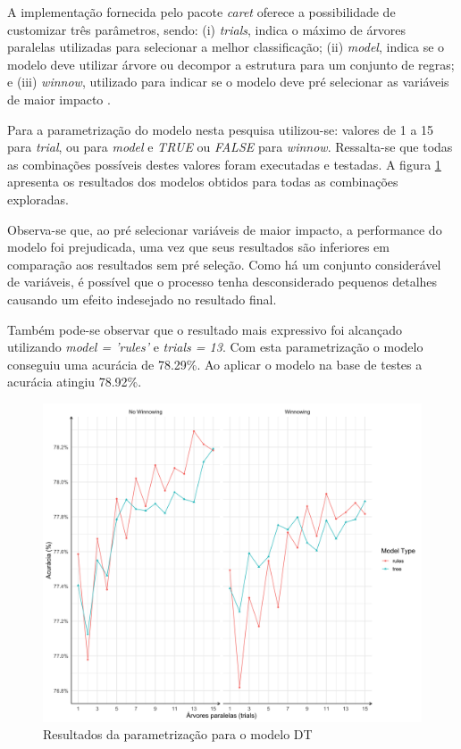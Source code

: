 \documentclass[12pt]{article}
\begin{document}
A implementação fornecida pelo pacote \textit{caret} oferece a possibilidade de customizar três parâmetros, sendo: (i) \textit{trials}, indica o máximo de árvores paralelas utilizadas para selecionar a melhor classificação; (ii) \textit{model}, indica se o modelo deve utilizar árvore ou decompor a estrutura para um conjunto de regras; e (iii) \textit{winnow}, utilizado para indicar se o modelo deve pré selecionar as variáveis de maior impacto \cite{caret:r, cran:r}. 


Para a parametrização  do modelo nesta pesquisa utilizou-se: valores de 1 a 15 para \textit{trial}, \textit{} ou \textit{} para \textit{model} e \textit{TRUE} ou \textit{FALSE} para \textit{winnow}.  Ressalta-se que todas as combinações possíveis destes valores foram executadas e testadas. A figura \ref{fig:dt_resultados} apresenta os resultados dos modelos obtidos para todas as combinações exploradas.

Observa-se que, ao pré selecionar variáveis de maior impacto, a performance do modelo foi prejudicada, uma vez que seus resultados são inferiores em comparação aos resultados sem pré seleção. Como há um conjunto considerável de variáveis, é possível que o processo tenha desconsiderado pequenos detalhes causando um efeito indesejado no resultado final.

Também pode-se observar que o resultado mais expressivo foi alcançado utilizando \textit{model = 'rules'} e \textit{trials = 13}. Com esta parametrização o modelo conseguiu uma acurácia de 78.29\%. Ao aplicar o modelo na base de testes a acurácia atingiu 78.92\%.

\begin{figure}[ht]
\centering
\includegraphics[width=.8\textwidth]{dt_resultados.png}
\caption{Resultados da parametrização para o modelo DT}
\label{fig:dt_resultados}
\end{figure}
\end{document}
